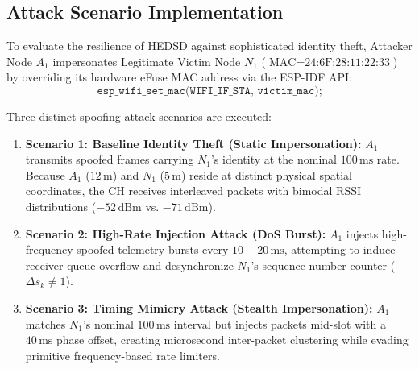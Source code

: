 \subsection{Attack Scenario Implementation}
To evaluate the resilience of \ac{HEDSD} against sophisticated identity theft, Attacker Node $A_1$ impersonates Legitimate Victim Node $N_1$ ($\text{MAC} = \text{24:6F:28:11:22:33}$) by overriding its hardware eFuse MAC address via the ESP-IDF API:
\begin{equation}
    \texttt{esp\_wifi\_set\_mac(WIFI\_IF\_STA, victim\_mac);}
\end{equation}

Three distinct spoofing attack scenarios are executed:
\begin{enumerate}
    \item \textbf{Scenario 1: Baseline Identity Theft (Static Impersonation):} $A_1$ transmits spoofed frames carrying $N_1$'s identity at the nominal $100\,\text{ms}$ rate. Because $A_1$ ($12\,\text{m}$) and $N_1$ ($5\,\text{m}$) reside at distinct physical spatial coordinates, the CH receives interleaved packets with bimodal \ac{RSSI} distributions ($-52\,\text{dBm}$ vs. $-71\,\text{dBm}$).
    \item \textbf{Scenario 2: High-Rate Injection Attack (DoS Burst):} $A_1$ injects high-frequency spoofed telemetry bursts every $10-20\,\text{ms}$, attempting to induce receiver queue overflow and desynchronize $N_1$'s sequence number counter ($\Delta s_k \neq 1$).
    \item \textbf{Scenario 3: Timing Mimicry Attack (Stealth Impersonation):} $A_1$ matches $N_1$'s nominal $100\,\text{ms}$ interval but injects packets mid-slot with a $40\,\text{ms}$ phase offset, creating microsecond inter-packet clustering while evading primitive frequency-based rate limiters.
\end{enumerate}

